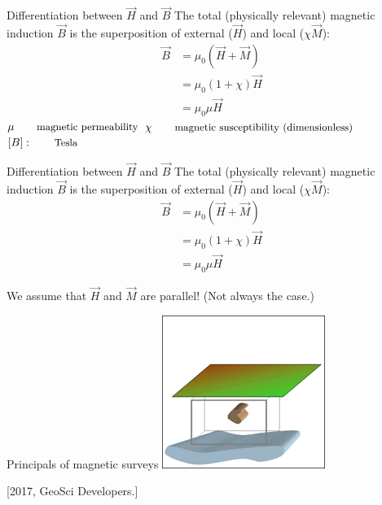     \begin{frame}
      \begin{PointSix}{Differentiation between $\vec{H}$ and $\vec{B}$}
      The total (physically relevant) magnetic induction $\vec{B}$ is the superposition of external ($\vec{H}$) and local ($\chi \vec{M}$):
      \begin{align*}
        \vec{B} &= \mu_0\left(\vec{H} + \vec{M} \right)\\
                &= \mu_0 (1 + \chi) \vec{H} \\
                &= \mu_0 \mu \vec{H}
      \end{align*}
      $\mu \qquad \text{\small magnetic permeability}$
      $\chi \qquad \text{\small magnetic susceptibility (dimensionless)}$
      $[B]: \qquad \text{\small Tesla}$
      \end{PointSix}
    \end{frame}

    \begin{frame}
      \begin{PointSix}{Differentiation between $\vec{H}$ and $\vec{B}$}
      The total (physically relevant) magnetic induction $\vec{B}$ is the superposition of external ($\vec{H}$) and local ($\chi \vec{M}$):
      \begin{align*}
        \vec{B} &= \mu_0\left(\vec{H} + \vec{M} \right)\\
                &= \mu_0 (1 + \chi) \vec{H} \\
                &= \mu_0 \mu \vec{H}
      \end{align*}
   

      \alert{We assume that $\vec{H}$ and $\vec{M}$ are parallel! (Not always the case.)}
      \end{PointSix}
    \end{frame}


    \begin{frame}
      \begin{PointSix}{Principals of magnetic surveys}
        \includegraphics[width=0.80\linewidth]{Figures/Magnetics/no_field.png}

      \tiny [2017, GeoSci Developers.]
      \end{PointSix}
    \end{frame}

